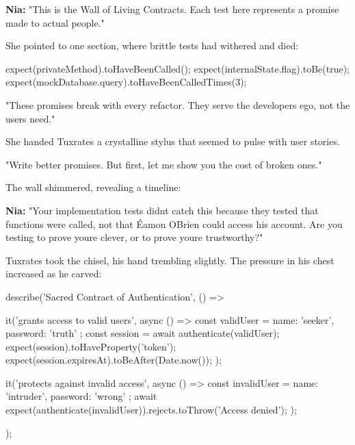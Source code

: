 \textbf{Nia:} "This is the Wall of Living Contracts. Each test here represents a promise made to actual people."

She pointed to one section, where brittle tests had withered and died:

\begin{codeblock}
expect(privateMethod).toHaveBeenCalled();
expect(internalState.flag).toBe(true);
expect(mockDatabase.query).toHaveBeenCalledTimes(3);
\end{codeblock}

"These promises break with every refactor. They serve the developer\textquotesingle s ego, not the user\textquotesingle s need."

She handed Tuxrates a crystalline stylus that seemed to pulse with user stories.

"Write better promises. But first, let me show you the cost of broken ones."

The wall shimmered, revealing a timeline:


\textbf{Nia:} "Your implementation tests didn\textquotesingle t catch this because they tested that functions were called, not that Éamon O\textquotesingle Brien could access his account. Are you testing to prove you\textquotesingle re clever, or to prove you\textquotesingle re trustworthy?"

Tuxrates took the chisel, his hand trembling slightly. The pressure in his chest increased as he carved:

\begin{codeblock}
describe('Sacred Contract of Authentication', () => {
  it('grants access to valid users', async () => {
    const validUser = { name: 'seeker', password: 'truth' };
    const session = await authenticate(validUser);
    expect(session).toHaveProperty('token');
    expect(session.expiresAt).toBeAfter(Date.now());
  });
  
  it('protects against invalid access', async () => {
    const invalidUser = { name: 'intruder', password: 'wrong' };
    await expect(authenticate(invalidUser)).rejects.toThrow('Access denied');
  });
});
\end{codeblock}

